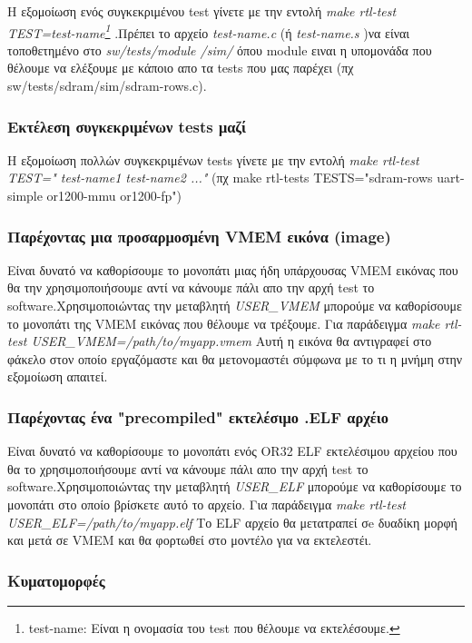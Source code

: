 \documentclass[a4paper,10pt]{article}
\numberwithin{figure}{subsection}
\numberwithin{table}{subsection}
\begin{document}
{{{{Η εξομοίωση ενός συγκεκριμένου test γίνετε με την εντολή
\emph{make rtl-test TEST=test-name\footnote{test-name: Είναι η ονομασία του test που θέλουμε να εκτελέσουμε.}} .Πρέπει το αρχείο \emph{test-name.c}
 (ή \emph{test-name.s} )να είναι τοποθετημένο στο \emph{sw/tests/module /sim/ } όπου module ειναι η υπομονάδα που θέλουμε να ελέξουμε με κάποιο απο τα tests που μας παρέχει 
(πχ sw/tests/sdram/sim/sdram-rows.c).
}

\subsubsection{Εκτέλεση συγκεκριμένων tests μαζί}
{

Η εξομοίωση πολλών συγκεκριμένων tests γίνετε με την εντολή \emph{make rtl-test TEST=" test-name1 test-name2 ..."} (πχ make rtl-tests TESTS="sdram-rows uart-simple or1200-mmu or1200-fp")
}


\subsubsection{ Παρέχοντας μια προσαρμοσμένη VMEM εικόνα (image)}
{

Είναι δυνατό να καθορίσουμε το μονοπάτι μιας ήδη υπάρχουσας VMEM εικόνας που θα την
χρησιμοποιήσουμε αντί να κάνουμε πάλι απο την αρχή test το software.Χρησιμοποιώντας
την μεταβλητή \emph{USER\_VMEM} μπορούμε να καθορίσουμε το μονοπάτι της VMEM εικόνας
που θέλουμε να τρέξουμε. Για παράδειγμα \emph{make rtl-test USER\_VMEM=/path/to/myapp.vmem}
Αυτή η εικόνα θα αντιγραφεί στο φάκελο στον οποίο εργαζόμαστε και θα μετονομαστέι
σύμφωνα με το τι η μνήμη στην εξομοίωση απαιτεί.
}

\subsubsection{ Παρέχοντας ένα "precompiled" εκτελέσιμο .ELF αρχέιο}
{

Είναι δυνατό να καθορίσουμε το μονοπάτι ενός OR32 ELF εκτελέσιμου αρχείου που θα το
χρησιμοποιήσουμε αντί να κάνουμε πάλι απο την αρχή test το software.Χρησιμοποιώντας
την μεταβλητή \emph{USER\_ELF} μπορούμε να καθορίσουμε το μονοπάτι στο οποίο βρίσκετε
αυτό το αρχείο. Για παράδειγμα \emph{make rtl-test USER\_ELF=/path/to/myapp.elf}
Το ELF αρχείο θα μετατραπεί σe δυαδίκη μορφή και μετά σε VMEM και θα φορτωθεί στο
μοντέλο για να εκτελεστέι.
}


\subsubsection{ Κυματομορφές}
{

}}}}
\end{document}
